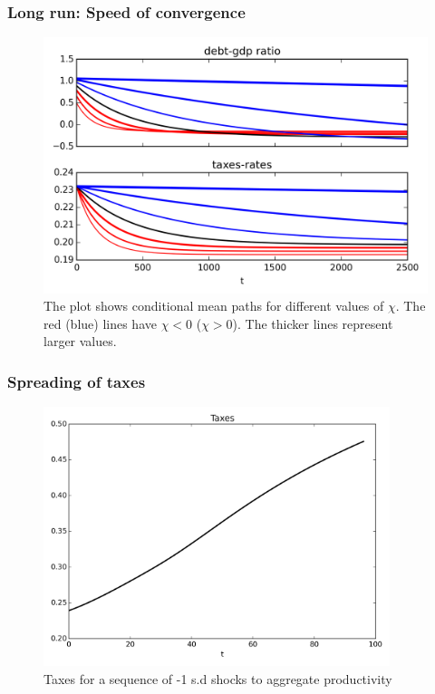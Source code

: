 \documentclass{beamer}
\begin{document}
\begin{frame}
\frametitle{Long run: Speed of convergence}
 {
  \begin{figure}
    \centering
    \includegraphics[width = 1.0\textwidth]{cesplots/speed_of_convergence.png}
    \caption{The plot shows conditional mean paths for different values of $\chi$. The red (blue) lines have $\chi<0$ ($\chi>0$). The thicker lines represent larger values.}
  \end{figure}

}

\end{frame}

\begin{frame}
 \frametitle{Spreading of taxes}
{
  \begin{figure}
    \centering
    \includegraphics[width = 0.9\textwidth]{cesplots/taxes_only_bad_shocks.png}
    \caption{Taxes for a sequence of -1 s.d shocks to aggregate productivity}
  \end{figure}

} 
 
\end{frame}
\end{document}
